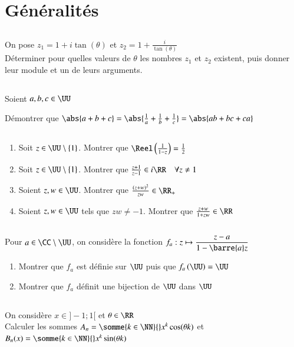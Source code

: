 \documentclass[oneside,12pt]{article}
\begin{document}
\section{Généralités}

\subsection{}
On pose $z_1=1+i\tan(\theta)$ et $z_2=1+\frac{i}{\tan(\theta)}$\\
Déterminer pour quelles valeurs de $\theta$ les nombres $z_1$ et $z_2$ existent, puis donner leur module et un de leurs arguments.

\subsection{}
Soient $a,b,c\in\UU$

Démontrer que $\abs{a+b+c}=\abs{\frac{1}{a}+\frac{1}{b}+\frac{1}{c}}=\abs{ab+bc+ca}$

\subsection{}
\begin{enumerate}
	\item Soit $z\in\UU\setminus\{1\}$. \quad
	Montrer que $\Reel\left(\frac{1}{1-z}\right)=\frac{1}{2}$
	\item Soit $z\in\UU\setminus\{1\}$.\quad
	Montrer que $\frac{z+1}{z-1}\in i\RR \quad \forall z \neq 1$
	\item Soient $z,w\in\UU$. \quad
	Montrer que $\frac{(z+w)^2}{zw} \in \RR_+$
	\item Soient $z,w\in\UU$ tels que $zw\neq-1$. \quad
	Montrer que $\frac{z+w}{1+zw} \in \RR$ 
\end{enumerate}

\subsection{}
Pour $a\in\CC\setminus\UU$, on considère la fonction $f_a:z\mapsto\dfrac{z-a}{1-\barre{a}z}$
\begin{enumerate}
	\item Montrer que $f_a$ est définie sur $\UU$ puis que $f_a\left(\UU\right)=\UU$
	\item Montrer que $f_a$ définit une bijection de $\UU$ dans $\UU$
\end{enumerate}

\subsection{}
On considère $x\in]-1;1[$ et $\theta\in\RR$\\
Calculer les sommes $A_n=\somme{k\in\NN}{}x^k\cos(\theta k)$ \quad et \quad $B_n(x)=\somme{k\in\NN}{}x^k\sin(\theta k)$
\end{document}
